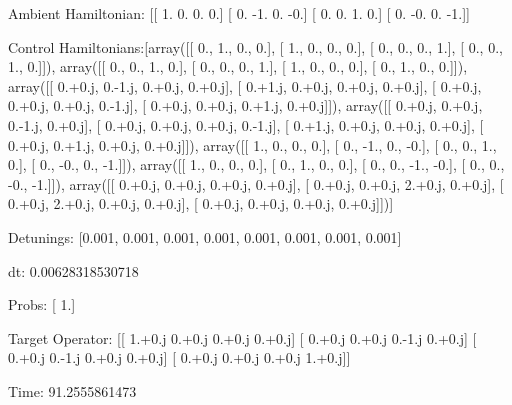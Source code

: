 \documentclass{article}
\begin{document}
    

\newpage

Ambient Hamiltonian: [[ 1.  0.  0.  0.]
 [ 0. -1.  0. -0.]
 [ 0.  0.  1.  0.]
 [ 0. -0.  0. -1.]]

Control Hamiltonians:[array([[ 0.,  1.,  0.,  0.],
       [ 1.,  0.,  0.,  0.],
       [ 0.,  0.,  0.,  1.],
       [ 0.,  0.,  1.,  0.]]), array([[ 0.,  0.,  1.,  0.],
       [ 0.,  0.,  0.,  1.],
       [ 1.,  0.,  0.,  0.],
       [ 0.,  1.,  0.,  0.]]), array([[ 0.+0.j,  0.-1.j,  0.+0.j,  0.+0.j],
       [ 0.+1.j,  0.+0.j,  0.+0.j,  0.+0.j],
       [ 0.+0.j,  0.+0.j,  0.+0.j,  0.-1.j],
       [ 0.+0.j,  0.+0.j,  0.+1.j,  0.+0.j]]), array([[ 0.+0.j,  0.+0.j,  0.-1.j,  0.+0.j],
       [ 0.+0.j,  0.+0.j,  0.+0.j,  0.-1.j],
       [ 0.+1.j,  0.+0.j,  0.+0.j,  0.+0.j],
       [ 0.+0.j,  0.+1.j,  0.+0.j,  0.+0.j]]), array([[ 1.,  0.,  0.,  0.],
       [ 0., -1.,  0., -0.],
       [ 0.,  0.,  1.,  0.],
       [ 0., -0.,  0., -1.]]), array([[ 1.,  0.,  0.,  0.],
       [ 0.,  1.,  0.,  0.],
       [ 0.,  0., -1., -0.],
       [ 0.,  0., -0., -1.]]), array([[ 0.+0.j,  0.+0.j,  0.+0.j,  0.+0.j],
       [ 0.+0.j,  0.+0.j,  2.+0.j,  0.+0.j],
       [ 0.+0.j,  2.+0.j,  0.+0.j,  0.+0.j],
       [ 0.+0.j,  0.+0.j,  0.+0.j,  0.+0.j]])]

Detunings: [0.001, 0.001, 0.001, 0.001, 0.001, 0.001, 0.001, 0.001]

 dt: 0.00628318530718

Probs: [ 1.]

Target Operator: [[ 1.+0.j  0.+0.j  0.+0.j  0.+0.j]
 [ 0.+0.j  0.+0.j  0.-1.j  0.+0.j]
 [ 0.+0.j  0.-1.j  0.+0.j  0.+0.j]
 [ 0.+0.j  0.+0.j  0.+0.j  1.+0.j]]

Time: 91.2555861473
\end{document}
